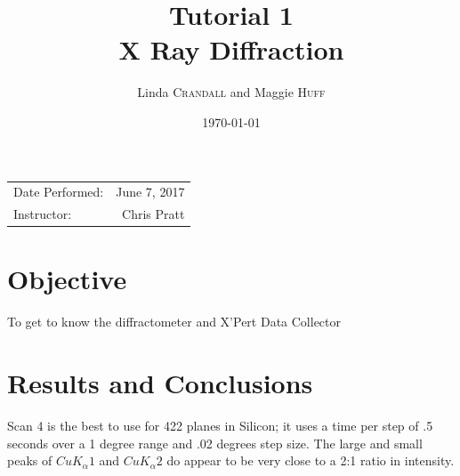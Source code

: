 \documentclass{article}
\title{Tutorial 1\\ X Ray Diffraction \\ } %
\author{Linda \textsc{Crandall} and Maggie \textsc{Huff}} %
\date{\today} %
\begin{document}
\maketitle %

\begin{center}
\begin{tabular}{l r}
Date Performed: & June 7, 2017 \\ %
Instructor: & Chris Pratt %
\end{tabular}
\end{center}



\section{Objective}

To get to know the diffractometer and X'Pert Data Collector 




\section{Results and Conclusions}

Scan 4 is the best to use for {422} planes in Silicon; it uses a time per step of .5 seconds over a 1 degree range and .02 degrees step size. The large and small peaks of $CuK_\alpha1$ and $CuK_\alpha2$ do appear to be very close to a 2:1 ratio in intensity. 
\end{document}
